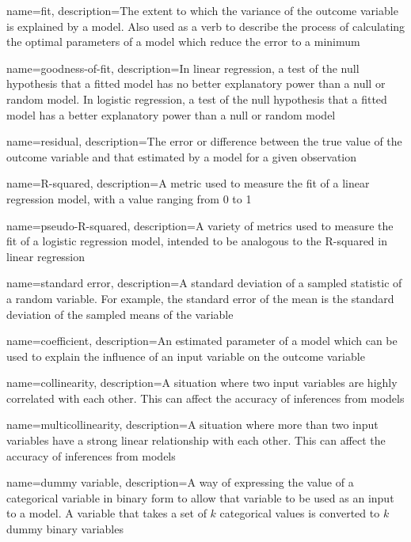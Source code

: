 {
    name={fit},
    description={The extent to which the variance of the outcome variable is explained by a model.  Also used as a verb to describe the process of calculating the optimal parameters of a model which reduce the error to a minimum}
}

{
    name={goodness-of-fit},
    description={In linear regression, a test of the null hypothesis that a fitted model has no better explanatory power than a null or random model.  In logistic regression, a test of the null hypothesis that a fitted model has a better explanatory power than a null or random model}
}

{
    name={residual},
    description={The error or difference between the true value of the outcome variable and that estimated by a model for a given observation}
}

{
    name={R-squared},
    description={A metric used to measure the fit of a linear regression model, with a value ranging from 0 to 1}
}

{
    name={pseudo-R-squared},
    description={A variety of metrics used to measure the fit of a logistic regression model, intended to be analogous to the R-squared in linear regression}
}

{
    name={standard error},
    description={A standard deviation of a sampled statistic of a random variable.  For example, the standard error of the mean is the standard deviation of the sampled means of the variable}
}

{
    name={coefficient},
    description={An estimated parameter of a model which can be used to explain the influence of an input variable on the outcome variable}
}

{
    name={collinearity},
    description={A situation where two input variables are highly correlated with each other.  This can affect the accuracy of inferences from models}
}

{
    name={multicollinearity},
    description={A situation where more than two input variables have a strong linear relationship with each other.  This can affect the accuracy of inferences from models}
}

{
    name={dummy variable},
    description={A way of expressing the value of a categorical variable in binary form to allow that variable to be used as an input to a model.  A variable that takes a set of $k$ categorical values is converted to $k$ dummy binary variables}
}

